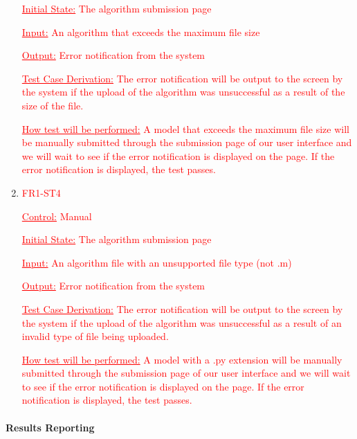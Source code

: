 \documentclass[12pt, titlepage]{article}
\begin{document}
\begin{enumerate}
\textcolor{red}{\underline{Initial State:} The algorithm submission page}

\textcolor{red}{\underline{Input:} An algorithm that exceeds the maximum file size}

\textcolor{red}{\underline{Output:} Error notification from the system}

\textcolor{red}{\underline{Test Case Derivation:} The error notification will be output to the screen by the system if the upload of the algorithm was unsuccessful as a result of the size of the file.}

\textcolor{red}{\underline{How test will be performed:} A model that exceeds the maximum file size will be manually submitted through the submission page of our user interface and we will wait to see if the error notification is displayed on the page. If the error notification is displayed, the test passes.}


\item{\textcolor{red}{FR1-ST4}\\}

\textcolor{red}{\underline{Control:} Manual}

\textcolor{red}{\underline{Initial State:} The algorithm submission page}

\textcolor{red}{\underline{Input:} An algorithm file with an unsupported file type (not .m)}

\textcolor{red}{\underline{Output:} Error notification from the system}

\textcolor{red}{\underline{Test Case Derivation:} The error notification will be output to the screen by the system if the upload of the algorithm was unsuccessful as a result of an invalid type of file being uploaded.}

\textcolor{red}{\underline{How test will be performed:} A model with a .py extension will be manually submitted through the submission page of our user interface and we will wait to see if the error notification is displayed on the page. If the error notification is displayed, the test passes.}

\end{enumerate}

\paragraph{Results Reporting}
\end{document}
